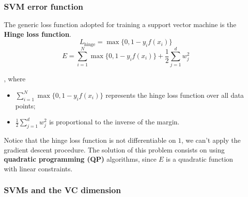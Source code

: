 \subsubsection{SVM error function}
The generic loss function adopted for training a support vector machine is the \textbf{Hinge loss function}. 
$$L_{\text{hinge}} = \max \{0, 1- y_if(x_i)\}$$
$$E = \sum\limits_{i=1}^N\max\{0,1-y_if(x_i)\}+\frac{1}{2}\sum\limits_{j = 1}^dw_j^2$$

, where

\begin{itemize}
	\item $\sum\limits_{i=1}^N\max\{0,1-y_if(x_i)\}$ represents the hinge loss function over all data points;
	\item $\frac{1}{2}\sum\limits_{j = 1}^dw_j^2$ is proportional to the inverse of the margin.
\end{itemize}
Notice that the hinge loss function is not differentiable on $1$, we can't apply the gradient descent procedure. The solution of this problem consists on using \textbf{quadratic programming (QP)} algorithms, since $E$ is a quadratic function with linear constraints.


\subsubsection{SVMs and the VC dimension}
